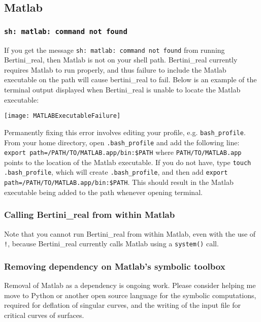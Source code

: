 \subsection{Matlab}

\subsubsection{\tt sh: matlab: command not found}

If you get the message {\tt sh: matlab: command not found} from running Bertini\_real, then Matlab is not on your shell path.  Bertini\_real currently requires Matlab to run properly, and thus failure to include the Matlab executable on the path will cause bertini\_real to fail. Below is an example of the terminal output displayed when Bertini\_real is unable to locate the Matlab executable: 
 
\begin{center}\begin{minipage}{0.9\linewidth}
\centering
\texttt{[image: MATLABExecutableFailure]}
\end{minipage}\end{center}

Permanently fixing this error involves editing your profile, e.g. \texttt{bash\_profile}. From your home directory, open \texttt{.bash\_profile} and add the following line: \texttt{export \gls{path}=/PATH/TO/MATLAB.app/bin:\$PATH} where \texttt{PATH/TO/MATLAB.app} points to the location of the Matlab executable. If you do not have, type \texttt{touch .bash\_profile}, which will create \texttt{.bash\_profile}, and then add \texttt{export \gls{path}=/PATH/TO/MATLAB.app/bin:\$PATH}. This should result in the Matlab executable being added to the path whenever opening terminal. 




\subsubsection{Calling Bertini\_real from within Matlab}

Note that you cannot run Bertini\_real from within Matlab, even with the use of {\tt !}, because Bertini\_real currently calls Matlab using a {\tt system()} call. 


\subsubsection{Removing dependency on Matlab's symbolic toolbox}



Removal of Matlab as a dependency is ongoing work.  Please consider helping me move to Python or another open source language for the symbolic computations, required for deflation of singular curves, and the writing of the input file for critical curves of surfaces.
